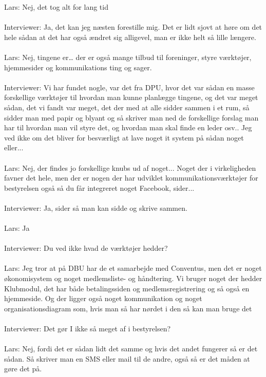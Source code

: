 Lars: Nej, det tog alt for lang tid
\\\\
Interviewer: Ja, det kan jeg næsten forestille mig. Det er lidt sjovt at høre om det hele sådan at det har også ændret sig alligevel, man er ikke helt så lille længere.
\\\\
Lars: Nej, tingene er… der er også mange tilbud til foreninger, styre værktøjer, hjemmesider og kommunikations ting og sager.
\\\\
Interviewer: Vi har fundet nogle, var det fra DPU, hvor det var sådan en masse forskellige værktøjer til hvordan man kunne planlægge tingene, og det var meget sådan, det vi fandt var meget, det der med at alle sidder sammen i et rum, så sidder man med papir og blyant og så skriver man ned de forskellige forslag man har til hvordan man vil styre det, og hvordan man skal finde en leder osv.. Jeg ved ikke om det bliver for besværligt at lave noget it system på sådan noget eller...       
\\\\
Lars: Nej, der findes jo forskellige knubs ud af noget... Noget der i virkeligheden favner det hele, men der er nogen der har udviklet kommunikationsværktøjer for bestyrelsen også så du får integreret noget Facebook, sider...
\\\\
Interviewer: Ja, sider så man kan sidde og skrive sammen.
\\\\
Lars: Ja
\\\\
Interviewer: Du ved ikke hvad de værktøjer hedder?
\\\\
Lars: Jeg tror at på DBU har de et samarbejde med Conventus, men det er noget økonomisystem og noget medlemsliste- og håndtering. Vi bruger noget der hedder Klubmodul, det har både betalingssiden og medlemsregistrering og så også en hjemmeside. Og der ligger også noget kommunikation og noget organisationsdiagram som, hvis man så har nørdet i den så kan man bruge det
\\\\
Interviewer: Det gør I ikke så meget af i bestyrelsen?
\\\\
Lars: Nej, fordi det er sådan lidt det samme og hvis det andet fungerer så er det sådan. Så skriver man en SMS eller mail til de andre, også så er det måden at gøre det på.
\\\\


